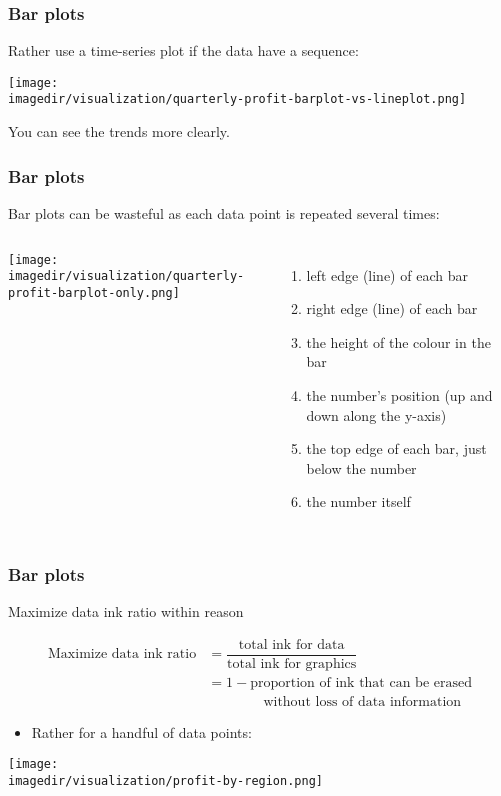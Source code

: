 \begin{frame}\frametitle{Bar plots}
	
	Rather use a time-series plot if the data have a sequence: 
	\begin{center}
		\texttt{[image: \\imagedir/visualization/quarterly-profit-barplot-vs-lineplot.png]}
	\end{center}
	You can see the trends more clearly.
\end{frame}

\begin{frame}\frametitle{Bar plots}
	
	Bar plots can be wasteful as each data point is repeated several times:
	\begin{columns}
		\column{6cm} 
			\begin{center}
				\texttt{[image: \\imagedir/visualization/quarterly-profit-barplot-only.png]} 
			\end{center}
		\column{4cm} 
			\begin{enumerate}
				\item	left edge (line) of each bar 
				\item	right edge (line) of each bar 
				\item	the height of the colour in the bar 
				\item	the number's position (up and down along the y-axis) 
				\item	the top edge of each bar, just below the number 
				\item	the number itself 
			\end{enumerate}
	\end{columns}
\end{frame}

\begin{frame}\frametitle{Bar plots}
	\begin{exampleblock}{Maximize data ink ratio within reason}
		\begin{center}
			\[
				\begin{array}{rl}
					\text{Maximize data ink ratio} 	&= \dfrac{\text{total ink for data}}{{\text{total ink for graphics}}} \\
													&= 1 - \text{proportion of ink that can be erased} \\
													&\qquad\qquad \text{without loss of data information} 
			\end{array}
			\]
		\end{center}
	\end{exampleblock}
	\begin{itemize}
		\item	Rather {\color{myOrange}{use a table}} for a handful of data points: 
	\end{itemize}
	\begin{center}
		\texttt{[image: \\imagedir/visualization/profit-by-region.png]}
	\end{center}
\end{frame}

